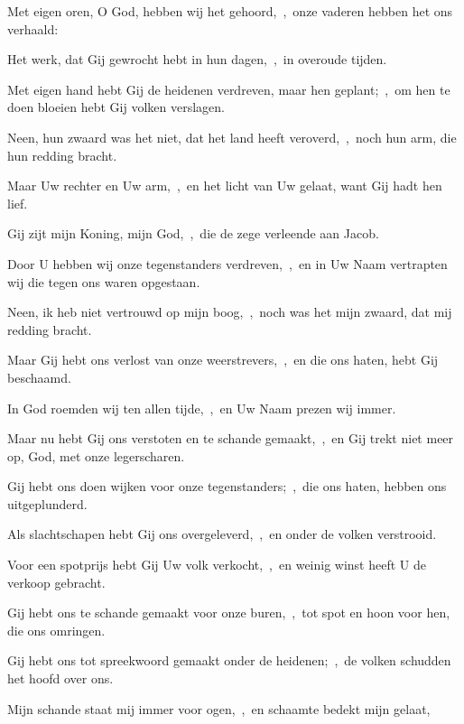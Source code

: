 \documentclass[12pt,twoside,a5paper]{article}
\begin{document}
\begin{halfparskip}

   Met eigen oren, O God, hebben wij het gehoord,~\sep\ onze vaderen hebben het ons verhaald:


  Het werk, dat Gij gewrocht hebt in hun dagen,~\sep\ in overoude tijden.

  Met eigen hand hebt Gij de heidenen verdreven, maar hen geplant;~\sep\ om hen te doen bloeien hebt Gij volken verslagen.

  Neen, hun zwaard was het niet, dat het land heeft veroverd,~\sep\ noch hun arm, die hun redding bracht.

  Maar Uw rechter en Uw arm,~\sep\ en het licht van Uw gelaat, want Gij hadt hen lief.

  Gij zijt mijn Koning, mijn God,~\sep\ die de zege verleende aan Jacob.

  Door U hebben wij onze tegenstanders verdreven,~\sep\ en in Uw Naam vertrapten wij die tegen ons waren opgestaan.

  Neen, ik heb niet vertrouwd op mijn boog,~\sep\ noch was het mijn zwaard, dat mij redding bracht.

  Maar Gij hebt ons verlost van onze weerstrevers,~\sep\ en die ons haten, hebt Gij beschaamd.

  In God roemden wij ten allen tijde,~\sep\ en Uw Naam prezen wij immer.

  Maar nu hebt Gij ons verstoten en te schande gemaakt,~\sep\ en Gij trekt niet meer op, God, met onze legerscharen.

  Gij hebt ons doen wijken voor onze tegenstanders;~\sep\ die ons haten, hebben ons uitgeplunderd.

  Als slachtschapen hebt Gij ons overgeleverd,~\sep\ en onder de volken verstrooid.

  Voor een spotprijs hebt Gij Uw volk verkocht,~\sep\ en weinig winst heeft U de verkoop gebracht.

  Gij hebt ons te schande gemaakt voor onze buren,~\sep\ tot spot en hoon voor hen, die ons omringen.

  Gij hebt ons tot spreekwoord gemaakt onder de heidenen;~\sep\ de volken schudden het hoofd over ons.

  Mijn schande staat mij immer voor ogen,~\sep\ en schaamte bedekt mijn gelaat,


\end{halfparskip}
\end{document}
